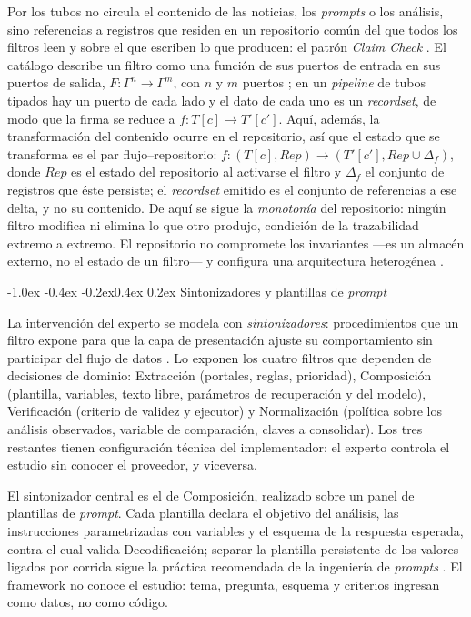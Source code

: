 \documentclass[12pt,a4paper,twocolumn]{article}
\makeatletter
\renewcommand\subsection{\@startsection{subsection}{2}{\z@}%
  {-1.0ex \@plus -0.4ex \@minus -0.2ex}{0.4ex \@plus 0.2ex}%
  {\normalfont\normalsize\bfseries\itshape}}
\makeatother
\begin{document}
Por los tubos no circula el contenido de las noticias, los \textit{prompts} o los análisis, sino referencias a registros que residen en un repositorio común del que todos los filtros leen y sobre el que escriben lo que producen: el patrón \textit{Claim Check} \cite{hohpe:2003}. El catálogo describe un filtro como una función de sus puertos de entrada en sus puertos de salida, \(F : \Gamma^n \to \Gamma^m\), con \(n\) y \(m\) puertos \cite{cristia:2025}; en un \textit{pipeline} de tubos tipados hay un puerto de cada lado y el dato de cada uno es un \textit{recordset}, de modo que la firma se reduce a \(f : T[c] \to T'[c']\). Aquí, además, la transformación del contenido ocurre en el repositorio, así que el estado que se transforma es el par flujo--repositorio: \(f : (T[c], \mathit{Rep}) \to (T'[c'], \mathit{Rep} \cup \Delta_f)\), donde \(\mathit{Rep}\) es el estado del repositorio al activarse el filtro y \(\Delta_f\) el conjunto de registros que éste persiste; el \textit{recordset} emitido es el conjunto de referencias a ese delta, y no su contenido. De aquí se sigue la \textit{monotonía} del repositorio: ningún filtro modifica ni elimina lo que otro produjo, condición de la trazabilidad extremo a extremo. El repositorio no compromete los invariantes ---es un almacén externo, no el estado de un filtro--- y configura una arquitectura heterogénea \cite{garlanshaw:1994}.

\subsection{Sintonizadores y plantillas de \textit{prompt}}

La intervención del experto se modela con \textit{sintonizadores}: procedimientos que un filtro expone para que la capa de presentación ajuste su comportamiento sin participar del flujo de datos \cite{cristia:2025,garlanshaw:1994}. Lo exponen los cuatro filtros que dependen de decisiones de dominio: Extracción (portales, reglas, prioridad), Composición (plantilla, variables, texto libre, parámetros de recuperación y del modelo), Verificación (criterio de validez y ejecutor) y Normalización (política sobre los análisis observados, variable de comparación, claves a consolidar). Los tres restantes tienen configuración técnica del implementador: el experto controla el estudio sin conocer el proveedor, y viceversa.

El sintonizador central es el de Composición, realizado sobre un panel de plantillas de \textit{prompt}. Cada plantilla declara el objetivo del análisis, las instrucciones parametrizadas con variables y el esquema de la respuesta esperada, contra el cual valida Decodificación; separar la plantilla persistente de los valores ligados por corrida sigue la práctica recomendada de la ingeniería de \textit{prompts} \cite{prompt-eng:2024}. El framework no conoce el estudio: tema, pregunta, esquema y criterios ingresan como datos, no como código.
\end{document}
